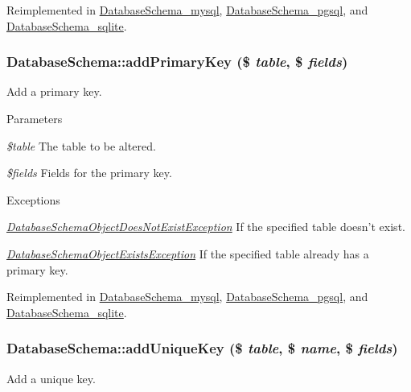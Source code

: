 Reimplemented in \hyperlink{classDatabaseSchema__mysql_a18bb0f395ccfb5bab5385485d1b8b12a}{DatabaseSchema\_\-mysql}, \hyperlink{classDatabaseSchema__pgsql_afced2f073c4a42004d74b6feb1f3f46e}{DatabaseSchema\_\-pgsql}, and \hyperlink{classDatabaseSchema__sqlite_af6c71cb38c8cf5b8e37fe00d9c32861c}{DatabaseSchema\_\-sqlite}.\hypertarget{classDatabaseSchema_abe9490392e8408eb3847256aeb15bba0}{
\subsubsection[{addPrimaryKey}]{\setlength{\rightskip}{0pt plus 5cm}DatabaseSchema::addPrimaryKey (\$ {\em table}, \/  \$ {\em fields})}}
\label{classDatabaseSchema_abe9490392e8408eb3847256aeb15bba0}
Add a primary key.


\begin{DoxyParams}{Parameters}
\item[{\em \$table}]The table to be altered. \item[{\em \$fields}]Fields for the primary key.\end{DoxyParams}

\begin{DoxyExceptions}{Exceptions}
\item[{\em \hyperlink{classDatabaseSchemaObjectDoesNotExistException}{DatabaseSchemaObjectDoesNotExistException}}]If the specified table doesn't exist. \item[{\em \hyperlink{classDatabaseSchemaObjectExistsException}{DatabaseSchemaObjectExistsException}}]If the specified table already has a primary key. \end{DoxyExceptions}


Reimplemented in \hyperlink{classDatabaseSchema__mysql_af133b10cf19353fef894d1a0550f7b2b}{DatabaseSchema\_\-mysql}, \hyperlink{classDatabaseSchema__pgsql_ad6f1224f726c193393c134c975a0cd50}{DatabaseSchema\_\-pgsql}, and \hyperlink{classDatabaseSchema__sqlite_a00b3d8c7ebad2d9ca71d41e3caab7624}{DatabaseSchema\_\-sqlite}.\hypertarget{classDatabaseSchema_ac2e6358da1c2d38fe6a1a1d003dac8ca}{
\subsubsection[{addUniqueKey}]{\setlength{\rightskip}{0pt plus 5cm}DatabaseSchema::addUniqueKey (\$ {\em table}, \/  \$ {\em name}, \/  \$ {\em fields})}}
\label{classDatabaseSchema_ac2e6358da1c2d38fe6a1a1d003dac8ca}
Add a unique key.


